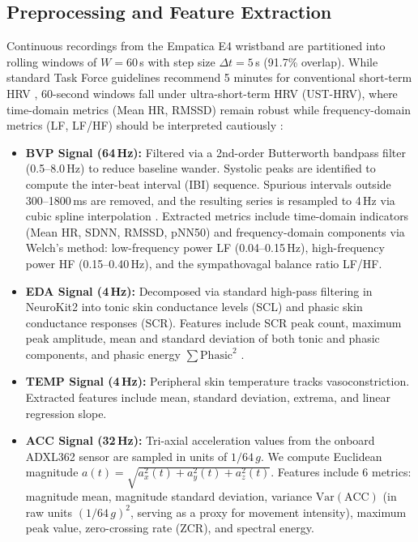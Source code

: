 \documentclass[conference]{IEEEtran}
\begin{document}
\subsection{Preprocessing and Feature Extraction}
Continuous recordings from the Empatica E4 wristband are partitioned into rolling windows of $W = 60$\,s with step size $\Delta t = 5$\,s (91.7\% overlap). While standard Task Force guidelines recommend 5 minutes for conventional short-term HRV \cite{taskforce1996heart}, 60-second windows fall under ultra-short-term HRV (UST-HRV), where time-domain metrics (Mean HR, RMSSD) remain robust while frequency-domain metrics (LF, LF/HF) should be interpreted cautiously \cite{castaldo2015acute}:
\begin{itemize}
    \item \textbf{BVP Signal (64\,Hz):} Filtered via a 2nd-order Butterworth bandpass filter (0.5--8.0\,Hz) to reduce baseline wander. Systolic peaks are identified to compute the inter-beat interval (IBI) sequence. Spurious intervals outside 300--1800\,ms are removed, and the resulting series is resampled to 4\,Hz via cubic spline interpolation \cite{tarvainen2014kubios}. Extracted metrics include time-domain indicators (Mean HR, SDNN, RMSSD, pNN50) and frequency-domain components via Welch's method: low-frequency power LF (0.04--0.15\,Hz), high-frequency power HF (0.15--0.40\,Hz), and the sympathovagal balance ratio LF/HF.
    \item \textbf{EDA Signal (4\,Hz):} Decomposed via standard high-pass filtering in NeuroKit2 \cite{makowski2021neurokit2, boucsein2012electrodermal} into tonic skin conductance levels (SCL) and phasic skin conductance responses (SCR). Features include SCR peak count, maximum peak amplitude, mean and standard deviation of both tonic and phasic components, and phasic energy $\sum \text{Phasic}^2$ \cite{boucsein2012electrodermal}.
    \item \textbf{TEMP Signal (4\,Hz):} Peripheral skin temperature tracks vasoconstriction. Extracted features include mean, standard deviation, extrema, and linear regression slope.
    \item \textbf{ACC Signal (32\,Hz):} Tri-axial acceleration values from the onboard ADXL362 sensor are sampled in units of $1/64\,g$. We compute Euclidean magnitude $a(t) = \sqrt{a_x^2(t) + a_y^2(t) + a_z^2(t)}$. Features include 6 metrics: magnitude mean, magnitude standard deviation, variance $\text{Var}(\text{ACC})$ (in raw units $(1/64\,g)^2$, serving as a proxy for movement intensity), maximum peak value, zero-crossing rate (ZCR), and spectral energy.
\end{itemize}
\end{document}
